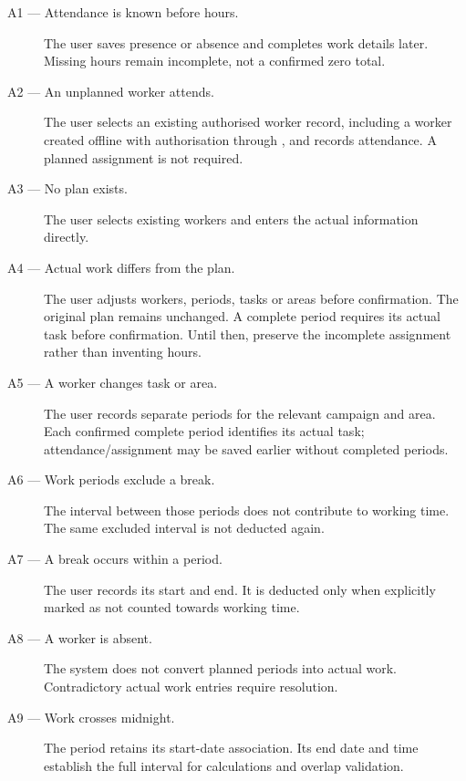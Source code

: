 \begin{description}

    \item[A1 --- Attendance is known before hours.]
    The user saves presence or absence
    and completes work details later.
    Missing hours remain incomplete,
    not a confirmed zero total.

    \item[A2 --- An unplanned worker attends.]
    The user selects an existing authorised
    worker record, including a worker created offline with authorisation through ,
    and records attendance.
    A planned assignment is not required.

    \item[A3 --- No plan exists.]
    The user selects existing workers
    and enters the actual information directly.

    \item[A4 --- Actual work differs from the plan.]
    The user adjusts workers, periods,
    tasks or areas before confirmation.
    The original plan remains unchanged.
    A complete period requires its actual task before confirmation.
    Until then, preserve the incomplete assignment rather than inventing hours.

    \item[A5 --- A worker changes task or area.]
    The user records separate periods for the relevant campaign
    and area. Each confirmed complete period identifies its actual task;
    attendance/assignment may be saved earlier without completed periods.

    \item[A6 --- Work periods exclude a break.]
    The interval between those periods
    does not contribute to working time.
    The same excluded interval is not
    deducted again.

    \item[A7 --- A break occurs within a period.]
    The user records its start and end.
    It is deducted only when explicitly
    marked as not counted towards working time.

    \item[A8 --- A worker is absent.]
    The system does not convert planned
    periods into actual work.
    Contradictory actual work entries
    require resolution.

    \item[A9 --- Work crosses midnight.]
    The period retains its start-date association.
    Its end date and time establish
    the full interval for calculations
    and overlap validation.


\end{description}
